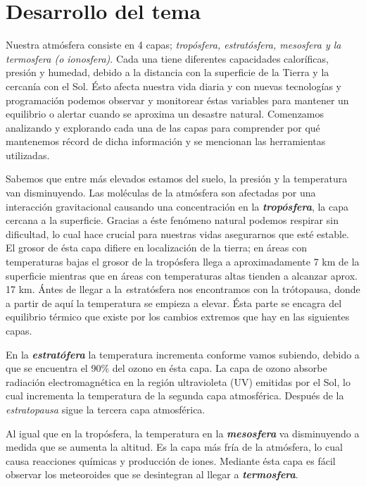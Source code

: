 \documentclass[12pt]{article}
\begin{document}
        \section{Desarrollo del tema}
\noindent Nuestra atmósfera consiste en 4 capas; \textit{trop\'osfera, estrat\'osfera, mesosfera y la termosfera (o ionosfera)}. Cada una tiene diferentes capacidades caloríficas, presión y humedad, debido a la distancia con la superficie de la Tierra y la cercan\'ia con el Sol. Ésto afecta nuestra vida diaria y con nuevas tecnologías y programación podemos observar y monitorear éstas variables para mantener un equilibrio o alertar cuando se aproxima un desastre natural. Comenzamos analizando y explorando cada una de las capas para comprender por qué mantenemos récord de dicha información y se mencionan las herramientas utilizadas.

Sabemos que entre más elevados estamos del suelo, la presión y la temperatura van disminuyendo. Las moléculas de la atmósfera son afectadas por una interacción gravitacional causando una concentración en la \textbf{\textit{tropósfera}}, la capa cercana a la superficie. Gracias a éste fenómeno natural podemos respirar sin dificultad, lo cual hace crucial para nuestras vidas asegurarnos que esté estable. El grosor de \'esta capa difiere en localizaci\'on de la tierra; en \'areas con temperaturas bajas el grosor de la trop\'osfera llega a aproximadamente 7 km de la superficie mientras que en \'areas con temperaturas altas tienden a alcanzar aprox. 17 km. \'Antes de llegar a la {\textit estrat\'osfera} nos encontramos con la tr\'otopausa, donde a partir de aqu\'i la temperatura se empieza a elevar. \'Esta parte se encagra del equilibrio t\'ermico que existe por los cambios extremos que hay en las siguientes capas.
 
 En la \textbf{\textit{estrat\'ofera}} la temperatura incrementa conforme vamos subiendo, debido a que se encuentra el 90\% del ozono en \'esta capa. La capa de ozono absorbe radiaci\'on electromagn\'etica en la regi\'on ultravioleta (UV) emitidas por el Sol, lo cual incrementa la temperatura de la segunda capa atmosf\'erica. Despu\'es de la \textit{estratopausa} sigue la tercera capa atmosf\'erica.
 
 Al igual que en la trop\'osfera, la temperatura en la \textbf{\textit{mesosfera}} va disminuyendo a medida que se aumenta la altitud. Es la capa m\'as fr\'ia de la atm\'osfera, lo cual causa reacciones qu\'imicas y producci\'on de iones. Mediante \'esta capa es f\'acil observar los meteoroides que se desintegran al llegar a \textbf{\textit{termosfera}}. 
\end{document}
